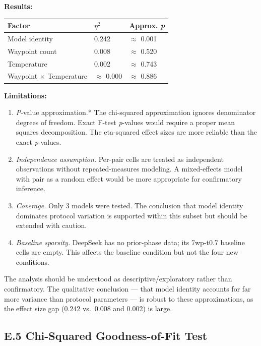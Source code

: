\textbf{Results:}

\begin{longtable}[]{@{}lll@{}}
\toprule\noalign{}
Factor & \(\eta^2\) & Approx. \emph{p} \\
\midrule\noalign{}
\endhead
\bottomrule\noalign{}
\endlastfoot
Model identity & 0.242 & \(\approx\) 0.001 \\
Waypoint count & 0.008 & \(\approx\) 0.520 \\
Temperature & 0.002 & \(\approx\) 0.743 \\
Waypoint \(\times\) Temperature & \(\approx\) 0.000 & \(\approx\) 0.886 \\
\end{longtable}

\textbf{Limitations:}

\begin{enumerate}
\def\labelenumi{\arabic{enumi}.}
\tightlist
\item
  \emph{P}-value approximation.* The chi-squared approximation ignores denominator degrees of freedom. Exact F-test \emph{p}-values would require a proper mean squares decomposition. The eta-squared effect sizes are more reliable than the exact \emph{p}-values.
\item
  \emph{Independence assumption.} Per-pair cells are treated as independent observations without repeated-measures modeling. A mixed-effects model with pair as a random effect would be more appropriate for confirmatory inference.
\item
  \emph{Coverage.} Only 3 models were tested. The conclusion that model identity dominates protocol variation is supported within this subset but should be extended with caution.
\item
  \emph{Baseline sparsity.} DeepSeek has no prior-phase data; its 7wp-t0.7 baseline cells are empty. This affects the baseline condition but not the four new conditions.
\end{enumerate}

The analysis should be understood as descriptive/exploratory rather than confirmatory. The qualitative conclusion --- that model identity accounts for far more variance than protocol parameters --- is robust to these approximations, as the effect size gap (0.242 vs.~0.008 and 0.002) is large.

\subsection{E.5 Chi-Squared Goodness-of-Fit Test}\label{e.5-chi-squared-goodness-of-fit-test}

